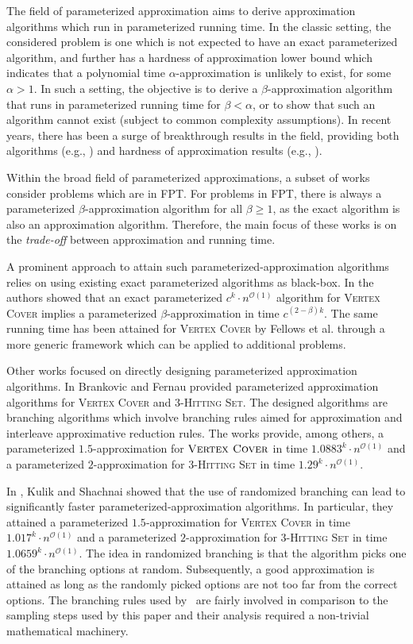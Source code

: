 \documentclass[letterpaper,11pt]{article}
\newcommand{\1}[1]{\mathds{1}\left[#1\right]}
\newcommand{\Oh}{\mathcal{O}}
\newcommand{\vc}{\textsc{Vertex Cover}\xspace}
\newcommand{\hs}[1]{\ensuremath{#1}\textsc{-Hitting Set}\xspace}
\begin{document}
The field of parameterized approximation aims to derive approximation algorithms which run in parameterized running time. In the classic setting, the considered problem is one which is not expected to have an exact parameterized algorithm, and further has a hardness of approximation lower bound which indicates that a polynomial time $\alpha$-approximation is unlikely to exist, for some $\alpha>1$. In such a setting, the objective is to derive a $\beta$-approximation algorithm that runs in parameterized running time for $\beta<\alpha$, or to show that such an algorithm cannot exist (subject to common complexity assumptions). In recent years, there has been a surge of breakthrough results in the field, providing both algorithms (e.g., \cite{La14,GKW19,DFK+18,Manu19,LSS20, BLM20, ABB+23,DKS23,ILSS23}) and hardness of approximation results  (e.g., \cite{GLRSW24,LRSW23, Wlod20,CCKLMNT20,BBE+21,Manu20,KK22,LRSW23b,CFLL23}).


Within the broad field of parameterized approximations, a subset of  works consider problems which are in FPT. For problems in FPT, there is always a parameterized $\beta$-approximation algorithm for all $\beta\geq 1$, as the exact algorithm is also an  approximation algorithm. Therefore, the main focus of these works is on the {\em trade-off} between approximation and running time. 

A prominent approach to attain such parameterized-approximation algorithms relies on using existing exact parameterized algorithms as black-box.
In \cite{BEP11} the authors showed  that an exact parameterized $c^k\cdot n^{\Oh(1)}$ algorithm for \vc implies a parameterized $\beta$-approximation in time $c^{(2-\beta )k}$. The same running time has been attained for \vc by Fellows et al. \cite{Fellows2018} through a more generic framework which can be applied to additional problems.  

Other works focused on directly designing parameterized approximation algorithms. 
In \cite{BF13,brankovicParameterizedApproximationAlgorithms2012} Brankovic and Fernau provided  parameterized approximation algorithms for \vc and \hs{3}.  The designed algorithms are branching algorithms which involve branching rules  aimed for approximation and interleave approximative reduction rules.  The works provide, among others, a parameterized  $1.5$-approximation for $\vc$ in time $1.0883^k\cdot n^{\Oh(1)}$ and a parameterized $2$-approximation for \hs{3} in time $1.29^k\cdot n^{\Oh(1)}$. 

In \cite{KulikS2020}, Kulik and Shachnai  showed that the use of randomized branching can lead to significantly faster parameterized-approximation algorithms.
 In particular,  they attained a parameterized  $1.5$-approximation for \vc in time $1.017^k \cdot n^{\Oh(1)}$ and a parameterized  $2$-approximation for \hs{3} in time $1.0659^k\cdot n^{\Oh(1)}$. 
 The idea in randomized branching is that the algorithm picks one of the branching options at random. Subsequently, a good approximation is attained as long as the randomly picked  options are  not too far from the correct options.  The branching rules used by~\cite{KulikS2020} are fairly involved in comparison to the sampling steps used by this paper and their analysis required a non-trivial mathematical machinery. 
\end{document}
